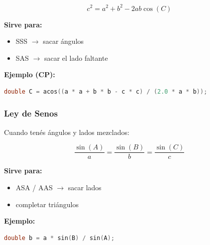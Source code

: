\[
c^2 = a^2 + b^2 - 2ab\cos(C)
\]

\textbf{Sirve para:}
\begin{itemize}
	\item SSS \(\to\) sacar ángulos
	\item SAS \(\to\) sacar el lado faltante
\end{itemize}

\textbf{Ejemplo (CP):}
\begin{lstlisting}[language=C++, caption={Ley de Cosenos: obtener un ángulo}]
	double C = acos((a * a + b * b - c * c) / (2.0 * a * b));
\end{lstlisting}

\subsubsection{Ley de Senos}
Cuando tenés ángulos y lados mezclados:

\[
\frac{\sin(A)}{a} = \frac{\sin(B)}{b} = \frac{\sin(C)}{c}
\]

\textbf{Sirve para:}
\begin{itemize}
	\item ASA / AAS \(\to\) sacar lados
	\item completar triángulos
\end{itemize}

\textbf{Ejemplo:}
\begin{lstlisting}[language=C++, caption={Ley de Senos: obtener un lado}]
	double b = a * sin(B) / sin(A);
\end{lstlisting}


